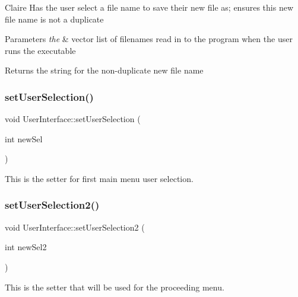 Claire Has the user select a file name to save their new file as; ensures this new file name is not a duplicate 
\begin{DoxyParams}{Parameters}
{\em the} & vector list of filenames read in to the program when the user runs the executable \\
\hline
\end{DoxyParams}
\begin{DoxyReturn}{Returns}
the string for the non-\/duplicate new file name 
\end{DoxyReturn}
\mbox{\label{classUserInterface_aadd67f3f0d6df7cf20807553c7885ba4}} 
\subsubsection{\texorpdfstring{set\+User\+Selection()}{setUserSelection()}}
{\footnotesize\ttfamily void User\+Interface\+::set\+User\+Selection (\begin{DoxyParamCaption}\item[{int}]{new\+Sel }\end{DoxyParamCaption})}

This is the setter for first main menu user selection. \mbox{\label{classUserInterface_a67883828a7799bf677ab953303d96476}} 
\subsubsection{\texorpdfstring{set\+User\+Selection2()}{setUserSelection2()}}
{\footnotesize\ttfamily void User\+Interface\+::set\+User\+Selection2 (\begin{DoxyParamCaption}\item[{int}]{new\+Sel2 }\end{DoxyParamCaption})}

This is the setter that will be used for the proceeding menu. \mbox{\label{classUserInterface_a7d5f75f5cadeb5fd99a912f29f918537}} 
